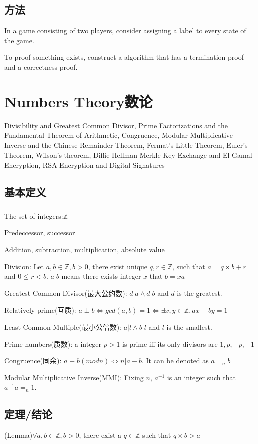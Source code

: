 \documentclass[12pt,a4paper]{ctexrep}
\begin{document}
\section{方法}
In a game consisting of two players, consider assigning a label to every state of the game.

To proof something exists, construct a algorithm that has a termination proof and a correctness proof.

\chapter{Numbers Theory数论}
Divisibility and Greatest Common Divisor, Prime Factorizations and the Fundamental Theorem of Arithmetic, Congruence, Modular Multiplicative Inverse and the Chinese Remainder Theorem, Fermat's Little Theorem, Euler's Theorem, Wilson's theorem, Diffie-Hellman-Merkle Key Exchange and El-Gamal Encryption, RSA Encryption and Digital Signatures
\section{基本定义}
\paragraph{}
The set of integers:$\mathbb{Z}$ 

Predeccessor, successor

Addition, subtraction, multiplication, absolute value

Division: Let $a,b \in \mathbb{Z}, b>0$, there exist unique $q,r \in \mathbb{Z}$, such that $a=q\times b+r$ and $0\leq r < b$. $a|b$ means there exists integer $x$ that $b = xa$

Greatest Common Divisor(最大公约数): $d|a \wedge d|b$ and $d$ is the greatest.

Relatively prime(互质): $a\perp b \Leftrightarrow gcd(a,b) = 1 \Leftrightarrow \exists x,y \in \mathbb{Z}, ax+by=1$

Least Common Multiple(最小公倍数): $a|l \wedge b|l$ and $l$ is the smallest.

Prime numbers(质数): a integer $p>1$ is prime iff its only divisors are $1,p,-p,-1$

Congruence(同余): $a\equiv b(mod n) \Leftrightarrow n|a-b$. It can be denoted as $a=_n b$

Modular Multiplicative Inverse(MMI): Fixing $n$, $a^{-1}$ is an integer such that $a^{-1}a =_n 1$.

\section{定理/结论}
(Lemma)$\forall a,b \in \mathbb{Z}, b>0$, there exist a $q \in \mathbb{Z}$ such that $q \times b >a$
\end{document}
